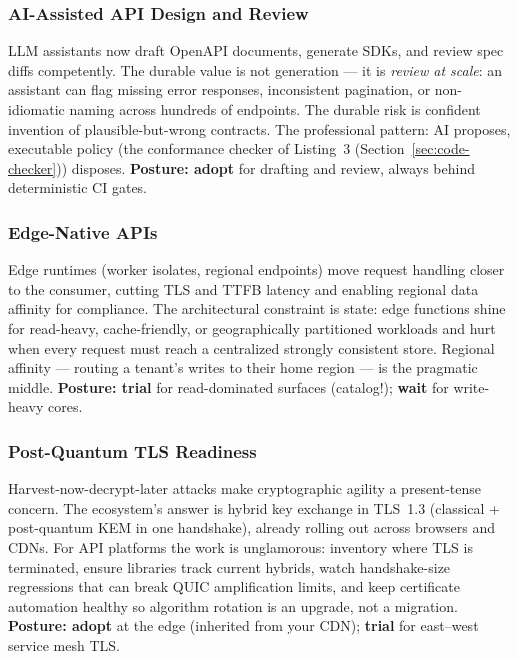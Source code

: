 \subsubsection{AI-Assisted API Design and Review}

LLM assistants now draft OpenAPI documents, generate SDKs, and review spec
diffs competently. The durable value is not generation --- it is
\emph{review at scale}: an assistant can flag missing error responses,
inconsistent pagination, or non-idiomatic naming across hundreds of
endpoints. The durable risk is confident invention of plausible-but-wrong
contracts. The professional pattern: AI proposes, executable policy (the
conformance checker of Listing~3 (Section~\ref{sec:code-checker})) disposes. \textbf{Posture:
adopt} for drafting and review, always behind deterministic CI gates.

\subsubsection{Edge-Native APIs}

Edge runtimes (worker isolates, regional endpoints) move request handling
closer to the consumer, cutting TLS and TTFB latency and enabling regional
data affinity for compliance. The architectural constraint is state: edge
functions shine for read-heavy, cache-friendly, or geographically partitioned
workloads and hurt when every request must reach a centralized strongly
consistent store. Regional affinity --- routing a tenant's writes to their
home region --- is the pragmatic middle. \textbf{Posture: trial} for
read-dominated surfaces (catalog!); \textbf{wait} for write-heavy cores.

\subsubsection{Post-Quantum TLS Readiness}

Harvest-now-decrypt-later attacks make cryptographic agility a present-tense
concern. The ecosystem's answer is hybrid key exchange in TLS~1.3
\cite{rfc8446} (classical + post-quantum KEM in one handshake), already
rolling out across browsers and CDNs. For API platforms the work is
unglamorous: inventory where TLS is terminated, ensure libraries track
current hybrids, watch handshake-size regressions that can break QUIC
amplification limits, and keep certificate automation healthy so algorithm
rotation is an upgrade, not a migration. \textbf{Posture: adopt} at the edge
(inherited from your CDN); \textbf{trial} for east--west service mesh TLS.

